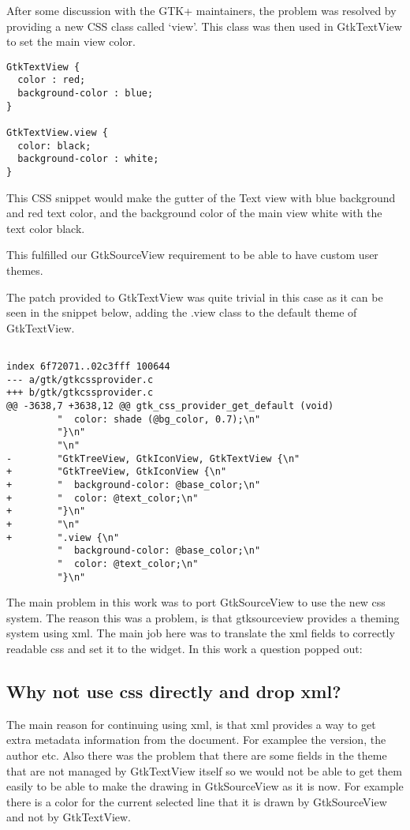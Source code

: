 After some discussion with the GTK+ maintainers, the problem was resolved by providing a new CSS class called `view'. 
This class was then used in GtkTextView to set the main view color.

\begin{lstlisting}[style=plain]
GtkTextView {
  color : red;
  background-color : blue;
}

GtkTextView.view {
  color: black;
  background-color : white;
}
\end{lstlisting}

This CSS snippet would make the gutter of the Text view with blue background and red text color, and the background color of the 
main view white with the text color black.

This fulfilled our GtkSourceView requirement to be able to have custom user themes.

The patch provided to GtkTextView was quite trivial in this case as it can be seen in the snippet below, adding the .view class to the default theme of GtkTextView.

\begin{lstlisting}[style=plain]

index 6f72071..02c3fff 100644
--- a/gtk/gtkcssprovider.c
+++ b/gtk/gtkcssprovider.c
@@ -3638,7 +3638,12 @@ gtk_css_provider_get_default (void)
         "  color: shade (@bg_color, 0.7);\n"
         "}\n"
         "\n"
-        "GtkTreeView, GtkIconView, GtkTextView {\n"
+        "GtkTreeView, GtkIconView {\n"
+        "  background-color: @base_color;\n"
+        "  color: @text_color;\n"
+        "}\n"
+        "\n"
+        ".view {\n"
         "  background-color: @base_color;\n"
         "  color: @text_color;\n"
         "}\n"

\end{lstlisting}

The main problem in this work was to port GtkSourceView to use the new css system. 
The reason this was a problem, is that gtksourceview provides a theming system 
using xml. The main job here was to translate the xml fields to correctly readable 
css and set it to the widget. In this work a question popped out:

\subsection*{Why not use css directly and drop xml?}

The main reason for continuing using xml, is that xml provides a way to get extra 
metadata information from the document. For examplee the version, the author etc. 
Also there was the problem that there are some fields in the theme that are not 
managed by GtkTextView itself so we would not be able to get them easily to be 
able to make the drawing in GtkSourceView as it is now. For example there is a 
color for the current selected line that it is drawn by GtkSourceView and not by 
GtkTextView.

